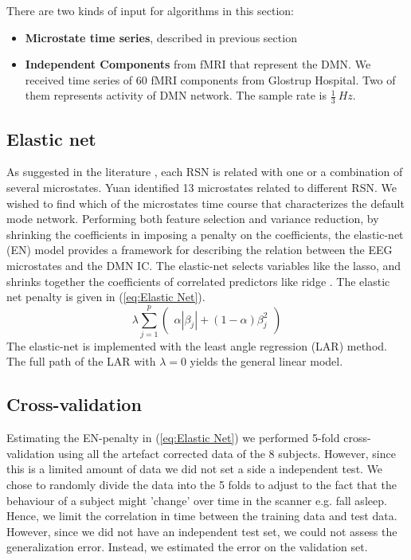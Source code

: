 \documentclass{article}
\begin{document}
There are two kinds of input for algorithms in this section:
\begin{itemize}
\item \textbf{Microstate time series}, described in previous section 
\item \textbf{Independent Components} from fMRI that represent the DMN. We received time series of 60 fMRI components from Glostrup Hospital. Two of them represents activity of DMN network. The sample rate is $\frac{1}{3}~Hz$. 
\end{itemize} 

\subsection{Elastic net}
As suggested in the literature \cite{Yuan20122062}, each RSN is related with one or a combination of several microstates. Yuan identified 13 microstates related to different RSN. We wished to find which of the microstates time course that characterizes the default mode network. Performing both feature selection and variance reduction, by shrinking the coefficients in imposing a penalty on the coefficients, the elastic-net (EN) model \cite{hastie01} provides a framework for  describing the relation between the EEG microstates and the DMN IC.
The elastic-net selects variables like the lasso, and shrinks together the coefficients of correlated predictors like ridge \cite{hastie01}. The elastic net penalty is given in (\ref{eq:Elastic Net}).
\begin{equation}
\label{eq:Elastic Net}
\lambda \sum_{j=1}^p
\begin{pmatrix}
\alpha |\beta_j| + (1-\alpha) \beta_j^2
\end{pmatrix}
\end{equation}
The elastic-net is implemented with the least angle regression (LAR) method. The full path of the LAR with $\lambda=0$ yields the general linear model.


\subsection{Cross-validation}
Estimating the EN-penalty in (\ref{eq:Elastic Net}) we performed 5-fold cross-validation using all the artefact corrected data of the 8 subjects. However, since this is a limited amount of data we did not set a side a independent test.
We chose to randomly divide the data into the 5 folds to adjust to the fact that the behaviour of a subject might 'change' over time in the scanner e.g. fall asleep. Hence, we limit the correlation in time between the training data and test data. However, since we did not have an independent test set, we could not assess the generalization error. Instead, we estimated the error on the validation set.
\end{document}
